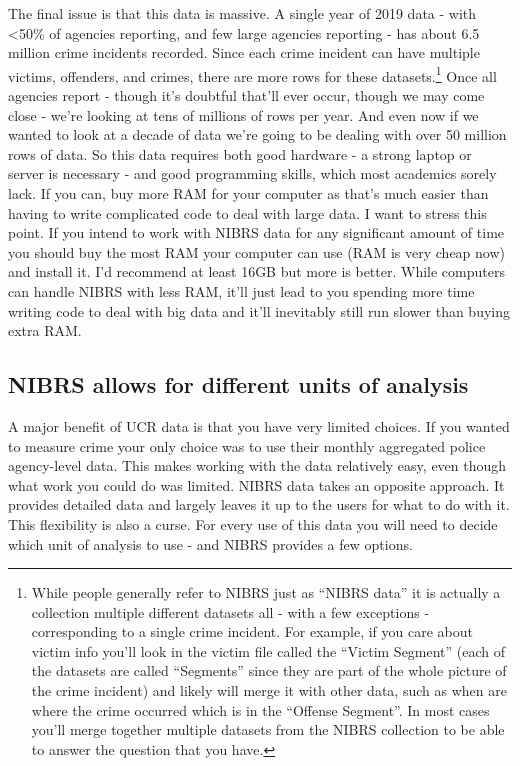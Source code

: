 \documentclass[
  12pt,
  openany]{book}
\begin{document}
The final issue is that this data is massive. A single year of 2019 data - with \textless50\% of agencies reporting, and few large agencies reporting - has about 6.5 million crime incidents recorded. Since each crime incident can have multiple victims, offenders, and crimes, there are more rows for these datasets.\footnote{While people generally refer to NIBRS just as ``NIBRS data'' it is actually a collection multiple different datasets all - with a few exceptions - corresponding to a single crime incident. For example, if you care about victim info you'll look in the victim file called the ``Victim Segment'' (each of the datasets are called ``Segments'' since they are part of the whole picture of the crime incident) and likely will merge it with other data, such as when are where the crime occurred which is in the ``Offense Segment''. In most cases you'll merge together multiple datasets from the NIBRS collection to be able to answer the question that you have.} Once all agencies report - though it's doubtful that'll ever occur, though we may come close - we're looking at tens of millions of rows per year. And even now if we wanted to look at a decade of data we're going to be dealing with over 50 million rows of data. So this data requires both good hardware - a strong laptop or server is necessary - and good programming skills, which most academics sorely lack. If you can, buy more RAM for your computer as that's much easier than having to write complicated code to deal with large data. I want to stress this point. If you intend to work with NIBRS data for any significant amount of time you should buy the most RAM your computer can use (RAM is very cheap now) and install it. I'd recommend at least 16GB but more is better. While computers can handle NIBRS with less RAM, it'll just lead to you spending more time writing code to deal with big data and it'll inevitably still run slower than buying extra RAM.

\subsection{NIBRS allows for different units of analysis}\label{nibrs-allows-for-different-units-of-analysis}

A major benefit of UCR data is that you have very limited choices. If you wanted to measure crime your only choice was to use their monthly aggregated police agency-level data. This makes working with the data relatively easy, even though what work you could do was limited. NIBRS data takes an opposite approach. It provides detailed data and largely leaves it up to the users for what to do with it. This flexibility is also a curse. For every use of this data you will need to decide which unit of analysis to use - and NIBRS provides a few options.
\end{document}
